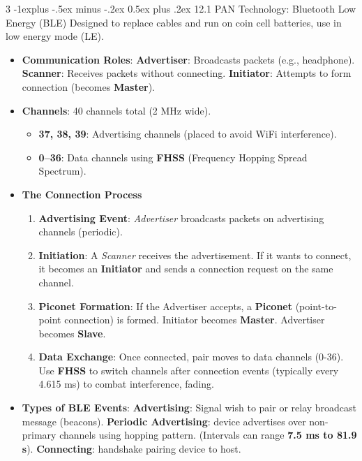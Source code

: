 \documentclass[a4paper, 9pt, landscape]{extarticle}
\makeatletter
\renewcommand{\subsection}{\@startsection{subsection}{2}{0mm}%
                                {-1explus -.5ex minus -.2ex}%
                                {0.5ex plus .2ex}%
                                {\normalfont\normalsize\bfseries}}
\makeatother
\begin{document}
\begin{multicols*}{3}
\subsection{12.1 PAN Technology: Bluetooth Low Energy (BLE)}
Designed to replace cables and run on coin cell batteries, use in low energy mode (LE).
\begin{itemize}
    \item \textbf{Communication Roles}: \textbf{Advertiser}: Broadcasts packets (e.g., headphone). \textbf{Scanner}: Receives packets without connecting. \textbf{Initiator}: Attempts to form connection (becomes \textbf{Master}).
    \item \textbf{Channels}: 40 channels total (2 MHz wide).
    \begin{itemize}
        \item \textbf{37, 38, 39}: Advertising channels (placed to avoid WiFi interference).
        \item \textbf{0--36}: Data channels using \textbf{FHSS} (Frequency Hopping Spread Spectrum).
    \end{itemize}
    \item \textbf{The Connection Process}
  \begin{enumerate}
    \item \textbf{Advertising Event}: \textit{Advertiser} broadcasts packets on advertising channels (periodic).
    \item \textbf{Initiation}: A \textit{Scanner} receives the advertisement. If it wants to connect, it becomes an \textbf{Initiator} and sends a connection request on the same channel.
    \item \textbf{Piconet Formation}: If the Advertiser accepts, a \textbf{Piconet} (point-to-point connection) is formed. Initiator becomes \textbf{Master}. Advertiser becomes \textbf{Slave}.
    \item \textbf{Data Exchange}: Once connected, pair moves to data channels (0-36). Use \textbf{FHSS} to switch channels after connection events (typically every 4.615 ms) to combat interference, fading.
  \end{enumerate}
  \item \textbf{Types of BLE Events}: \textbf{Advertising}: Signal wish to pair or relay broadcast message (beacons). \textbf{Periodic Advertising}: device advertises over non-primary channels using hopping pattern. (Intervals can range \textbf{7.5 ms to 81.9 s}). \textbf{Connecting}: handshake pairing device to host.
\end{itemize}


\end{multicols*}
\end{document}
